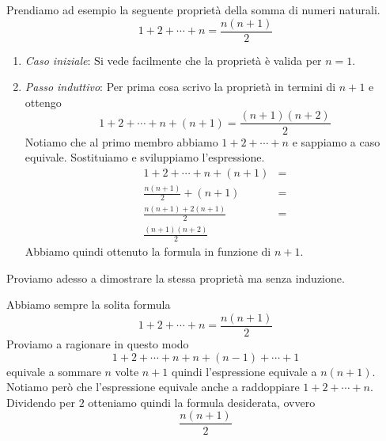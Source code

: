 \begin{example}
	Prendiamo ad esempio la seguente propriet\`a della somma di numeri naturali.
	\begin{equation*}
		1 + 2 + \cdots + n = \frac{n (n + 1)}{2}
	\end{equation*}

	\begin{enumerate}
		\item \emph{Caso iniziale}: Si vede facilmente che la propriet\`a \`e
		      valida per $n = 1$.
		\item \emph{Passo induttivo}: Per prima cosa scrivo la propriet\`a in termini
		      di $n + 1$ e ottengo
		      \begin{equation*}
			      1 + 2 + \cdots + n + (n + 1) = \frac{(n + 1)(n + 2)}{2}
		      \end{equation*}
		      Notiamo che al primo membro abbiamo $1 + 2 + \cdots + n$ e sappiamo
		      a caso equivale. Sostituiamo e sviluppiamo l'espressione.
		      \begin{align*}
			      1 + 2 + \cdots + n + (n + 1)  & = \\
			      \frac{n (n + 1)}{2} + (n + 1) & = \\
			      \frac{n(n + 1) + 2(n + 1)}{2} & = \\
			      \frac{(n + 1)(n + 2)}{2}
		      \end{align*}
		      Abbiamo quindi ottenuto la formula in funzione di $n + 1$.
	\end{enumerate}
\end{example}

Proviamo adesso a dimostrare la stessa propriet\`a ma senza induzione.

\begin{example}
	Abbiamo sempre la solita formula
	\begin{equation*}
		1 + 2 + \cdots + n = \frac{n(n + 1)}{2}
	\end{equation*}
	Proviamo a ragionare in questo modo
	\begin{equation*}
		1 + 2 + \cdots + n + n + (n - 1) + \cdots + 1
	\end{equation*}
	equivale a sommare $n$ volte $n + 1$ quindi l'espressione equivale a $n(n + 1)$. Notiamo
	per\`o che l'espressione equivale anche a raddoppiare $1 + 2 + \cdots + n$. Dividendo
	per $2$ otteniamo quindi la formula desiderata, ovvero
	\begin{equation*}
		\frac{n(n + 1)}{2}
	\end{equation*}
\end{example}

